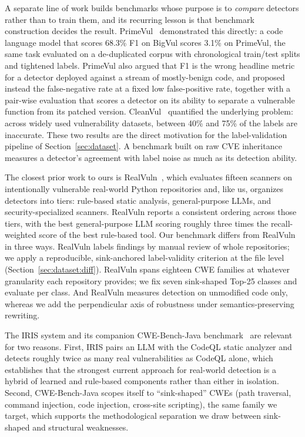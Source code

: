A separate line of work builds benchmarks whose purpose is to
\emph{compare} detectors rather than to train them, and its recurring
lesson is that benchmark construction decides the result.
PrimeVul~\cite{primevul} demonstrated this directly: a code
language model that scores 68.3\% F1 on BigVul scores 3.1\% on
PrimeVul, the same task evaluated on a de-duplicated corpus with
chronological train/test splits and tightened labels. PrimeVul also
argued that F1 is the wrong headline metric for a detector deployed
against a stream of mostly-benign code, and proposed instead the
false-negative rate at a fixed low false-positive rate, together with
a pair-wise evaluation that scores a detector on its ability to
separate a vulnerable function from its patched version.
CleanVul~\cite{cleanvul} quantified the underlying problem:
across widely used vulnerability datasets, between 40\% and 75\% of
the labels are inaccurate. These two results are the direct motivation
for the label-validation pipeline of Section~\ref{sec:dataset}. A
benchmark built on raw CVE inheritance measures a detector's agreement
with label noise as much as its detection ability.

The closest prior work to ours is RealVuln~\cite{realvuln}, which
evaluates fifteen scanners on intentionally vulnerable real-world
Python repositories and, like us, organizes detectors into tiers:
rule-based static analysis, general-purpose LLMs, and
security-specialized scanners. RealVuln reports a consistent ordering
across those tiers, with the best general-purpose LLM scoring roughly
three times the recall-weighted score of the best rule-based tool.
Our benchmark differs from RealVuln in three ways. RealVuln labels
findings by manual review of whole repositories; we apply a
reproducible, sink-anchored label-validity criterion at the file level
(Section~\ref{sec:dataset:diff}). RealVuln spans eighteen CWE families
at whatever granularity each repository provides; we fix seven
sink-shaped Top-25 classes and evaluate per class. And RealVuln
measures detection on unmodified code only, whereas we add the
perpendicular axis of robustness under semantics-preserving rewriting.

The IRIS system and its companion CWE-Bench-Java
benchmark~\cite{iris} are relevant for two reasons. First, IRIS
pairs an LLM with the CodeQL static analyzer and detects roughly twice
as many real vulnerabilities as CodeQL alone, which establishes that
the strongest current approach for real-world detection is a hybrid of
learned and rule-based components rather than either in isolation.
Second, CWE-Bench-Java scopes itself to ``sink-shaped'' CWEs (path
traversal, command injection, code injection, cross-site scripting),
the same family we target, which supports the methodological
separation we draw between sink-shaped and structural weaknesses.


